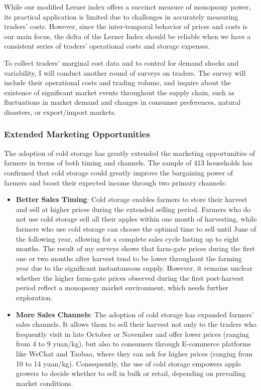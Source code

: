 \documentclass[12pt]{article}
\begin{document}
While our modified Lerner index offers a succinct measure of monopsony power, its practical application is limited due to challenges in accurately measuring traders' costs. However, since the inter-temporal behavior of prices and costs is our main focus, the delta of the Lerner Index should be reliable when we have a consistent series of traders' operational costs and storage expenses. 

To collect traders' marginal cost data and to control for demand shocks and variability, I will conduct another round of surveys on traders. The survey will include their operational costs and trading volume, and inquire about the existence of significant market events throughout the supply chain, such as fluctuations in market demand and changes in consumer preferences, natural disasters, or export/import markets.


\subsubsection{Extended Marketing Opportunities}
\noindent The adoption of cold storage has greatly extended the marketing opportunities of farmers in terms of both timing and channels. The sample of 413 households has confirmed that cold storage could greatly improve the bargaining power of farmers and boost their expected income through two primary channels:
\begin{itemize}
    \item \textbf{Better Sales Timing}: Cold storage enables farmers to store their harvest and sell at higher prices during the extended selling period. Farmers who do not use cold storage sell all their apples within one month of harvesting, while farmers who use cold storage can choose the optimal time to sell until June of the following year, allowing for a complete sales cycle lasting up to eight months. The result of my surveys shows that farm-gate prices during the first one or two months after harvest tend to be lower throughout the farming year due to the significant instantaneous supply. However, it remains unclear whether the higher farm-gate prices observed during the first post-harvest period reflect a monopsony market environment, which needs further exploration.
    
    \item \textbf{More Sales Channels}: The adoption of cold storage has expanded farmers' sales channels. It allows them to sell their harvest not only to the traders who frequently visit in late October or November and offer lower prices (ranging from 4 to 9 yuan/kg), but also to consumers through E-commerce platforms like WeChat and Taobao, where they can ask for higher prices (ranging from 10 to 14 yuan/kg). Consequently, the use of cold storage empowers apple growers to decide whether to sell in bulk or retail, depending on prevailing market conditions.
\end{itemize}
\end{document}
